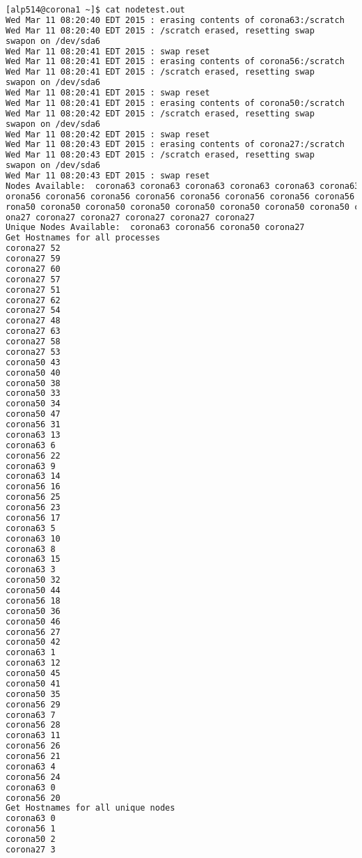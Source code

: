 \documentclass[10pt,t]{beamer}
\begin{document}
\begin{frame}
  \begin{lstlisting}[language=bash,deletekeywords={cat,for}]
[alp514@corona1 ~]$ cat nodetest.out
Wed Mar 11 08:20:40 EDT 2015 : erasing contents of corona63:/scratch
Wed Mar 11 08:20:40 EDT 2015 : /scratch erased, resetting swap
swapon on /dev/sda6
Wed Mar 11 08:20:41 EDT 2015 : swap reset
Wed Mar 11 08:20:41 EDT 2015 : erasing contents of corona56:/scratch
Wed Mar 11 08:20:41 EDT 2015 : /scratch erased, resetting swap
swapon on /dev/sda6
Wed Mar 11 08:20:41 EDT 2015 : swap reset
Wed Mar 11 08:20:41 EDT 2015 : erasing contents of corona50:/scratch
Wed Mar 11 08:20:42 EDT 2015 : /scratch erased, resetting swap
swapon on /dev/sda6
Wed Mar 11 08:20:42 EDT 2015 : swap reset
Wed Mar 11 08:20:43 EDT 2015 : erasing contents of corona27:/scratch
Wed Mar 11 08:20:43 EDT 2015 : /scratch erased, resetting swap
swapon on /dev/sda6
Wed Mar 11 08:20:43 EDT 2015 : swap reset
Nodes Available:  corona63 corona63 corona63 corona63 corona63 corona63 corona63 corona63 corona63 corona63 corona63 corona63 corona63 corona63 corona63 corona63 corona56 corona56 c
orona56 corona56 corona56 corona56 corona56 corona56 corona56 corona56 corona56 corona56 corona56 corona56 corona56 corona56 corona50 corona50 corona50 corona50 corona50 corona50 co
rona50 corona50 corona50 corona50 corona50 corona50 corona50 corona50 corona50 corona50 corona27 corona27 corona27 corona27 corona27 corona27 corona27 corona27 corona27 corona27 cor
ona27 corona27 corona27 corona27 corona27 corona27
Unique Nodes Available:  corona63 corona56 corona50 corona27
Get Hostnames for all processes
corona27 52
corona27 59
corona27 60
corona27 57
corona27 51
corona27 62
corona27 54
corona27 48
corona27 63
corona27 58
corona27 53
corona50 43
corona50 40
corona50 38
corona50 33
corona50 34
corona50 47
corona56 31
corona63 13
corona63 6
corona56 22
corona63 9
corona63 14
corona56 16
corona56 25
corona56 23
corona56 17
corona63 5
corona63 10
corona63 8
corona63 15
corona63 3
corona50 32
corona50 44
corona56 18
corona50 36
corona50 46
corona56 27
corona50 42
corona63 1
corona63 12
corona50 45
corona50 41
corona50 35
corona56 29
corona63 7
corona56 28
corona63 11
corona56 26
corona56 21
corona63 4
corona56 24
corona63 0
corona56 20
Get Hostnames for all unique nodes   
corona63 0
corona56 1
corona50 2
corona27 3
  \end{lstlisting}
\end{frame}
\end{document}
